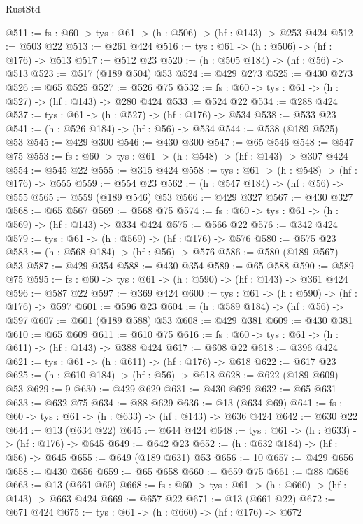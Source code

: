 \begin{lexlean}{RustStd}
\begin{coremodule}
@511 := {fs : @60} -> {tys : @61} -> (h : @506) -> (hf : @143) -> @253 @424
@512 := @503 @22
@513 := @261 @424
@516 := {tys : @61} -> (h : @506) -> (hf : @176) -> @513
@517 := @512 @23
@520 := (h : @505 @184) -> (hf : @56) -> @513
@523 := @517 (@189 @504) @53
@524 := @429 @273
@525 := @430 @273
@526 := @65 @525
@527 := @526 @75
@532 := {fs : @60} -> {tys : @61} -> (h : @527) -> (hf : @143) -> @280 @424
@533 := @524 @22
@534 := @288 @424
@537 := {tys : @61} -> (h : @527) -> (hf : @176) -> @534
@538 := @533 @23
@541 := (h : @526 @184) -> (hf : @56) -> @534
@544 := @538 (@189 @525) @53
@545 := @429 @300
@546 := @430 @300
@547 := @65 @546
@548 := @547 @75
@553 := {fs : @60} -> {tys : @61} -> (h : @548) -> (hf : @143) -> @307 @424
@554 := @545 @22
@555 := @315 @424
@558 := {tys : @61} -> (h : @548) -> (hf : @176) -> @555
@559 := @554 @23
@562 := (h : @547 @184) -> (hf : @56) -> @555
@565 := @559 (@189 @546) @53
@566 := @429 @327
@567 := @430 @327
@568 := @65 @567
@569 := @568 @75
@574 := {fs : @60} -> {tys : @61} -> (h : @569) -> (hf : @143) -> @334 @424
@575 := @566 @22
@576 := @342 @424
@579 := {tys : @61} -> (h : @569) -> (hf : @176) -> @576
@580 := @575 @23
@583 := (h : @568 @184) -> (hf : @56) -> @576
@586 := @580 (@189 @567) @53
@587 := @429 @354
@588 := @430 @354
@589 := @65 @588
@590 := @589 @75
@595 := {fs : @60} -> {tys : @61} -> (h : @590) -> (hf : @143) -> @361 @424
@596 := @587 @22
@597 := @369 @424
@600 := {tys : @61} -> (h : @590) -> (hf : @176) -> @597
@601 := @596 @23
@604 := (h : @589 @184) -> (hf : @56) -> @597
@607 := @601 (@189 @588) @53
@608 := @429 @381
@609 := @430 @381
@610 := @65 @609
@611 := @610 @75
@616 := {fs : @60} -> {tys : @61} -> (h : @611) -> (hf : @143) -> @388 @424
@617 := @608 @22
@618 := @396 @424
@621 := {tys : @61} -> (h : @611) -> (hf : @176) -> @618
@622 := @617 @23
@625 := (h : @610 @184) -> (hf : @56) -> @618
@628 := @622 (@189 @609) @53
@629 := 9
@630 := @429 @629
@631 := @430 @629
@632 := @65 @631
@633 := @632 @75
@634 := @88 @629
@636 := @13 (@634 @69)
@641 := {fs : @60} -> {tys : @61} -> (h : @633) -> (hf : @143) -> @636 @424
@642 := @630 @22
@644 := @13 (@634 @22)
@645 := @644 @424
@648 := {tys : @61} -> (h : @633) -> (hf : @176) -> @645
@649 := @642 @23
@652 := (h : @632 @184) -> (hf : @56) -> @645
@655 := @649 (@189 @631) @53
@656 := 10
@657 := @429 @656
@658 := @430 @656
@659 := @65 @658
@660 := @659 @75
@661 := @88 @656
@663 := @13 (@661 @69)
@668 := {fs : @60} -> {tys : @61} -> (h : @660) -> (hf : @143) -> @663 @424
@669 := @657 @22
@671 := @13 (@661 @22)
@672 := @671 @424
@675 := {tys : @61} -> (h : @660) -> (hf : @176) -> @672

\end{coremodule}
\end{lexlean}

